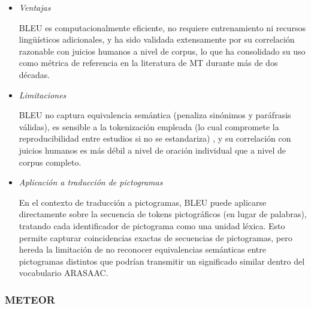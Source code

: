 \begin{itemize}
BLEU se expresa típicamente en una escala de 0 a 100 (o 0 a 1). Valores cercanos a 100 indican alta coincidencia léxica con la referencia; en la práctica, puntuaciones por encima de 30 suelen considerarse indicativas de una traducción comprensible, mientras que puntuaciones por encima de 50 se asocian con traducciones de alta calidad, aunque estos umbrales varían considerablemente según el par de idiomas y el dominio.

\item \textit{Ventajas}\\
\vspace{-0.5cm}

BLEU es computacionalmente eficiente, no requiere entrenamiento ni recursos lingüísticos adicionales, y ha sido validada extensamente por su correlación razonable con juicios humanos a nivel de corpus, lo que ha consolidado su uso como métrica de referencia en la literatura de MT durante más de dos décadas.

\item \textit{Limitaciones} \\
\vspace{-0.5cm}

BLEU no captura equivalencia semántica (penaliza sinónimos y paráfrasis válidas), es sensible a la tokenización empleada (lo cual compromete la reproducibilidad entre estudios si no se estandariza) \cite{lee2023survey}, y su correlación con juicios humanos es más débil a nivel de oración individual que a nivel de corpus completo.

\item \textit{Aplicación a traducción de pictogramas}\\
\vspace{-0.5cm}

En el contexto de traducción a pictogramas, BLEU puede aplicarse directamente sobre la secuencia de tokens pictográficos (en lugar de palabras), tratando cada identificador de pictograma como una unidad léxica. Esto permite capturar coincidencias exactas de secuencias de pictogramas, pero hereda la limitación de no reconocer equivalencias semánticas entre pictogramas distintos que podrían transmitir un significado similar dentro del vocabulario ARASAAC.
\end{itemize}


\subsubsection{METEOR}

